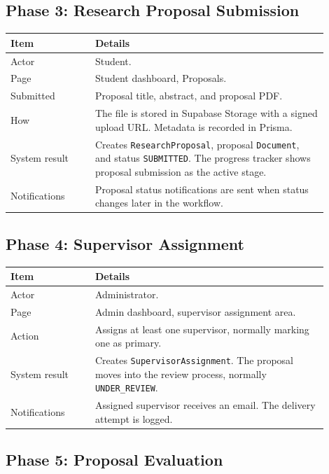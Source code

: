 \documentclass[11pt,a4paper]{article}
\newcommand{\status}[1]{\texttt{#1}}
\newcommand{\code}[1]{\texttt{#1}}
\begin{document}
\subsection{Phase 3: Research Proposal Submission}

\begin{longtable}{p{0.24\linewidth} p{0.66\linewidth}}
\toprule
\textbf{Item} & \textbf{Details} \\
\midrule
Actor & Student. \\
Page & Student dashboard, Proposals. \\
Submitted & Proposal title, abstract, and proposal PDF. \\
How & The file is stored in Supabase Storage with a signed upload URL. Metadata is recorded in Prisma. \\
System result & Creates \code{ResearchProposal}, proposal \code{Document}, and status \status{SUBMITTED}. The progress tracker shows proposal submission as the active stage. \\
Notifications & Proposal status notifications are sent when status changes later in the workflow. \\
\bottomrule
\end{longtable}

\subsection{Phase 4: Supervisor Assignment}

\begin{longtable}{p{0.24\linewidth} p{0.66\linewidth}}
\toprule
\textbf{Item} & \textbf{Details} \\
\midrule
Actor & Administrator. \\
Page & Admin dashboard, supervisor assignment area. \\
Action & Assigns at least one supervisor, normally marking one as primary. \\
System result & Creates \code{SupervisorAssignment}. The proposal moves into the review process, normally \status{UNDER\_REVIEW}. \\
Notifications & Assigned supervisor receives an email. The delivery attempt is logged. \\
\bottomrule
\end{longtable}

\subsection{Phase 5: Proposal Evaluation}
\end{document}
